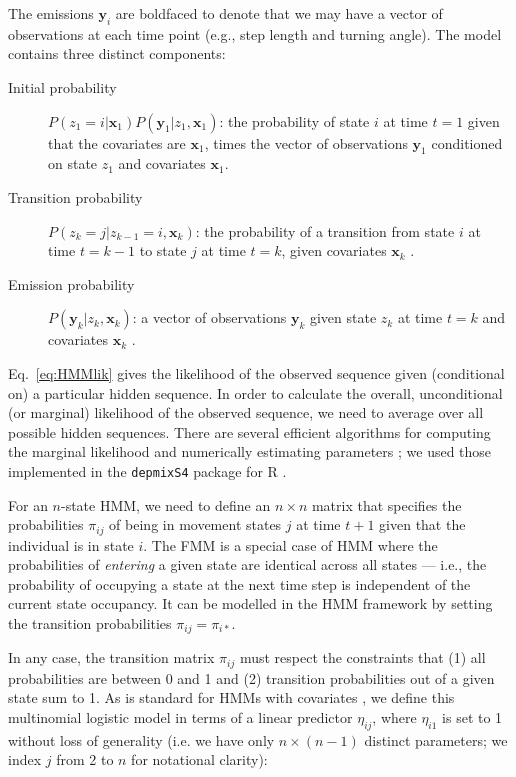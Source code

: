 \documentclass{bmcart}
\newcommand{\obs}{\mathbf{y}}
\newcommand{\cov}{\mathbf{x}}
\newcommand{\state}{z}
\begin{document}
The emissions $\obs_i$ are boldfaced to denote that we may have a vector of observations at each time point (e.g., step length and turning angle).
The model contains three distinct components:

\begin{description}
\item[Initial probability] $P(\state_{1} = i | \cov_{1}) P(\obs_{1} | \state_{1}, \cov_{1} )$: the probability of state $i$ at time $t=1$ given that the covariates are $\cov_{1}$, times the vector of observations $\obs_{1}$ conditioned on state $\state_{1}$ and covariates $\cov_{1}$.

\item[Transition probability] $P(\state_{k}=j | \state_{k-1}=i,\cov_{k})$: the probability of a transition from state $i$ at time $t=k-1$ to state $j$ at time $t=k$, given covariates $\cov_{k}$ .


\item[Emission probability] $P(\obs_{k} | \state_{k},\cov_{k})$: a vector of observations $\obs_{k}$ given state $\state_{k}$ at time $t=k$ and covariates $\cov_{k}$ .
\end{description}

Eq.~\ref{eq:HMMlik} gives the likelihood of the observed sequence 
given (conditional on) a particular
hidden sequence. 
In order to calculate the overall, unconditional (or marginal) 
likelihood of the 
observed sequence, we need to average over all possible hidden sequences. 
There are several efficient algorithms for computing the marginal likelihood and
numerically estimating parameters \cite{zucchini_hidden_2009};
we used those implemented in the \texttt{depmixS4} package for R
\cite{visser2010depmixs4,R}.

For an $n$-state HMM, we need to define an $n \times n$ matrix that specifies the probabilities $\pi_{ij}$ of being in movement states $j$ at time $t+1$ given that the individual is in state $i$.  The FMM is a special case of HMM where the probabilities of \emph{entering} a given state are identical across all states --- i.e., the probability of occupying a state at the next time step is independent of the current state occupancy. It can be modelled in the HMM framework by setting the transition probabilities  $\pi_{ij} = \pi_{i*}$.

In any case, the transition matrix $\pi_{ij}$ must respect the constraints that (1) all probabilities are between 0 and 1 and (2) transition probabilities out of a given state sum to 1.
As is standard for HMMs with covariates \cite{visser2010depmixs4}, we define this multinomial logistic model in terms of a linear predictor $\eta_{ij}$, where $\eta_{i1}$ is set to 1 without loss of generality (i.e. we have only $n \times (n-1)$ distinct parameters; we index $j$ from 2 to $n$ for notational clarity):
\end{document}
